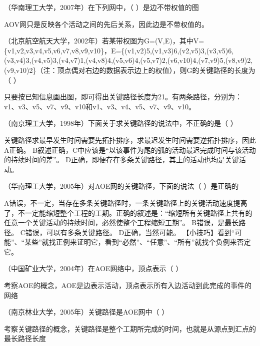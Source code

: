 \question （华南理工大学，2007年）在下列网中，（ ）是边不带权值的图
\par{}
\begin{solution}AOV网只是反映各个活动之间的先后关系，因此边是不带权值的。
\end{solution}
\question （北京航空航天大学，2002年）若某带权图为G=(V,E)，其中V=\{v1,v2,v3,v4,v5,v6,v7,v8,v9,v10\}，E=\{(v1,v2)5,(v1,v3)6,(v2,v5)3,(v3,v5)6,(v3,v4)3,(v4,v5)3,(v4,v7)1,(v4,v8)4,(v5,v6)4,(v5,v7)2,(v6,v10)4,(v7,v9)5,(v8,v9)2,(v9,v10)2\}（注：顶点偶对右边的数据表示边上的权值），则G的关键路径的长度为（
）
\par{}
\begin{solution}只要按已知信息画出图，即可得出关键路径长度为21。有两条路径，分别为：
v1、v3、v5、v7、v9、v10和v1、v3、v4、v5、v7、v9、v10。
\end{solution}
\question （南京理工大学，1998年）下面关于求关键路径的说法中，不正确的是（ ）
\par{}
\begin{solution}关键路径求最早发生时间需要先拓扑排序，求最迟发生时间需要逆拓扑排序，因此A正确。
B叙述正确，C中应该是``以该事件为尾的弧的活动最迟完成时间与该活动的持续时间的差''。
D正确，即便存在多条关键路径，其上的活动也均是关键活动。
\end{solution}
\question （华南理工大学，2005年）对AOE网的关键路径，下面的说法（ ）是正确的
\par{}
\begin{solution}A错误，不一定，当存在多条关键路径时，一条关键路径上的关键活动速度提高了，不一定能缩短整个工程的工期。正确的叙述是：``缩短所有关键路径上共有的任意一个关键活动的持续时间，必然使整个工程缩短工期''。
B错误，是最长路径。 C错误，可以有多条关键路径。 D正确，当然可能。
【小技巧】看到``可能''、``某些''就找正例来证明它，看到``必然''、``任意''、``所有''就找个负例来否定它。
\end{solution}
\question （中国矿业大学，2004年）在AOE网络中，顶点表示（ ）
\par{}
\begin{solution}考察AOE的概念，AOE是边表示活动，顶点表示所有入边活动到此完成的事件的网络
\end{solution}
\question （南京林业大学，2005年）关键路径是AOE网中（ ）
\par{}
\begin{solution}考察关键路径的概念，关键路径是整个工期所完成的时间，也就是从源点到汇点的最长路径长度
\end{solution}
